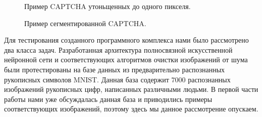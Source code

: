 \documentclass[a4paper,12pt,russian]{article} %
\begin{document}
\begin{figure}[t!]
	\caption{
		Пример CAPTCHA утоньщенных до одного пикселя.
        }
        \label{fig:cap_site_skelet}
\end{figure}

\begin{figure}[t!]
	\caption{
		Пример сегментированной CAPTCHA.
        }
        \label{fig:cap_site_segm}
\end{figure}



Для тестирования созданного программного комплекса нами было рассмотрено два класса задач.
Разработанная архитектура полносвязной искусственной нейронной сети и соответствующих алгоритмов очистки изображений от шума были протестированы на базе данных из предварительно распознанных рукописных символов MNIST.
Данная база содержит $7000$ распознанных изображений рукописных цифр, написанных различными людьми.
В первой части работы нами уже обсуждалась данная база и приводились примеры соответствующих изображений, поэтому здесь мы данное рассмотрение опускаем.
\end{document}
